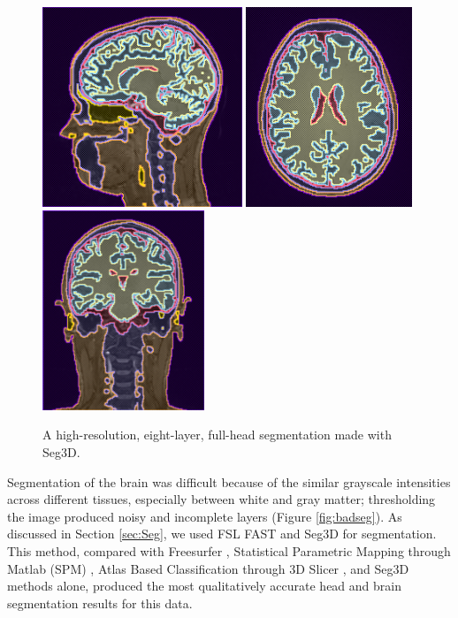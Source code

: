 \begin{figure}[H]
\begin{center}
\includegraphics[height=2.35in]{Figures/seg_1}
\includegraphics[height=2.35in]{Figures/seg_2}
\includegraphics[height=2.35in]{Figures/seg_3}
\caption{A high-resolution, eight-layer, full-head segmentation made with Seg3D.}
\label{fig:fullseg}
\end{center}
\end{figure}

Segmentation of the brain was difficult because of the similar grayscale intensities across different tissues, especially between white and gray matter; thresholding the image produced noisy and incomplete layers (Figure \ref{fig:badseg}). As discussed in Section \ref{sec:Seg}, we used FSL FAST and Seg3D for segmentation. This method, compared with Freesurfer \cite{ref:freesurf}, Statistical Parametric Mapping through Matlab (SPM) \cite{ref:spm}, Atlas Based Classification through 3D Slicer \cite{ref:abc}, and Seg3D methods alone, produced the most qualitatively accurate head and brain segmentation results for this data.

